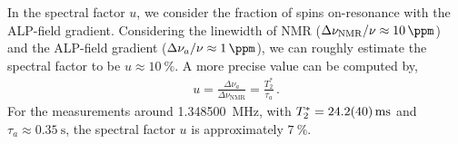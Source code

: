 In the spectral factor $u$, we consider the fraction of spins on-resonance with the ALP-field gradient. 
Considering the linewidth of NMR ($\Delta\nu_\mathrm{NMR}/\nu\approx\SI{10}{\ppm}$) and the ALP-field gradient ($\Delta\nu_a/\nu\approx\SI{1}{\ppm}$), we can roughly estimate the spectral factor to be $u\approx\SI{10}{\%}$. 
A more precise value can be computed by,
\begin{align}
    u=\frac{\Delta\nu_a}{\Delta\nu_\mathrm{NMR}} = \frac{T_2^*}{\tau_a}\,.
\end{align}
For the measurements around \SI{1.348500}{\MHz}, with $T_2^*=\SI{24.2 \pm 4}{\ms}$ and $\tau_a \approx \SI{0.35}{\s}$, the spectral factor $u$ is approximately $\SI{7}{\%}$. 

